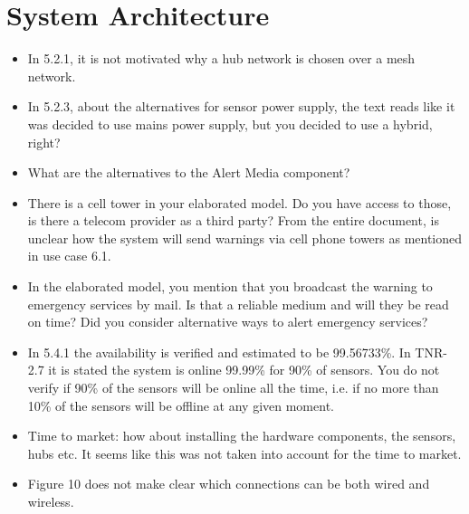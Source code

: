 \documentclass[a4paper,10pt]{article}
\begin{document}
\section{System Architecture}
\begin{itemize}
\item In 5.2.1, it is not motivated why a hub network is chosen over a mesh network.

\item In 5.2.3, about the alternatives for sensor power supply, the text reads like it was decided to use mains power supply, but you decided to use a hybrid, right?

\item What are the alternatives to the Alert Media component?

\item There is a cell tower in your elaborated model. Do you have access to those, is there a telecom provider as a third party? From the entire document, is unclear how the system will send warnings via cell phone towers as mentioned in use case 6.1.

\item In the elaborated model, you mention that you broadcast the warning to emergency services by mail. Is that a reliable medium and will they be read on time? Did you consider alternative ways to alert emergency services?

\item In 5.4.1 the availability is verified and estimated to be 99.56733\%. In TNR-2.7 it is stated the system is online 99.99\% for 90\% of sensors. You do not verify if 90\% of the sensors will be online all the time, i.e. if no more than 10\% of the sensors will be offline at any given moment.

\item Time to market: how about installing the hardware components, the sensors, hubs etc. It seems like this was not taken into account for the time to market.

\item Figure 10 does not make clear which connections can be both wired and wireless.


\end{itemize}
\end{document}
